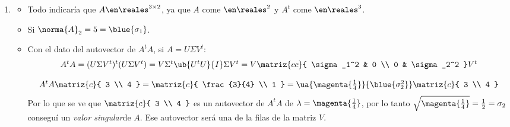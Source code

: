 \begin{enumerate}[label=\alph*)]
  \item
        \begin{itemize}
          \item Todo indicaría que $A \en \reales^{3 \times 2}$, ya que
                $A$ come  $ \en \reales^2$
                y $A^t$ come  $ \en \reales^3$.

          \item Si $\norma{A}_2 = 5 = \blue{\sigma_1}$.

          \item
                Con el dato del autovector de $A^tA$, si $A = U \Sigma V^t$:
                $$
                  \begin{array}{c}
                    A^tA =
                    (U \Sigma V^t)^t(U \Sigma V^t) =
                    V \Sigma^t \ub{U^tU}{I} \Sigma V^t =
                    V
                    \matriz{cc}{
                    \sigma_1^2 & 0          \\
                    0          & \sigma_2^2
                    } V^t                   \\
                    \\
                    A^tA
                    \matriz{c}{
                    3                       \\
                      4
                    }
                    =
                    \matriz{c}{
                    \frac{3}{4}             \\
                      1
                    }
                    =
                    \ua{
                      \magenta{\frac{1}{4}}
                    }{
                      \blue{\sigma^2_2}
                    }
                    \matriz{c}{
                    3                       \\
                      4
                    }
                  \end{array}
                $$
                Por lo que se ve que
                $\matriz{c}{
                    3                       \\
                    4
                  }$
                es un autovector de $A^tA$ de
                $\lambda = \magenta{\frac{1}{4}}$, por lo tanto $\sqrt{\magenta{\frac{1}{4}}} = \frac{1}{2} = \sigma_2 $
                conseguí un \textit{valor singular}de $A$.
                Ese autovector será una de la filas de la matriz $V$.


\end{itemize}
\end{enumerate}
